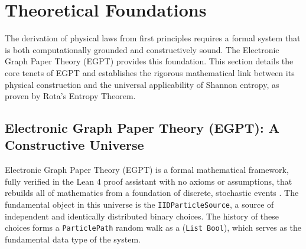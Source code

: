\documentclass[11pt, letterpaper]{article}
\begin{document}
\section{Theoretical Foundations}

The derivation of physical laws from first principles requires a formal system that is both computationally grounded and constructively sound. The Electronic Graph Paper Theory (EGPT) provides this foundation. This section details the core tenets of EGPT and establishes the rigorous mathematical link between its physical construction and the universal applicability of Shannon entropy, as proven by Rota's Entropy Theorem.

\subsection{Electronic Graph Paper Theory (EGPT): A Constructive Universe}

Electronic Graph Paper Theory (EGPT) is a formal mathematical framework, fully verified in the Lean 4 proof assistant with no axioms or assumptions, that rebuilds all of mathematics from a foundation of discrete, stochastic events \cite{EGPTRepo}. The fundamental object in this universe is the \texttt{IIDParticleSource}, a source of independent and identically distributed binary choices. The history of these choices forms a \texttt{ParticlePath} random walk as a (\texttt{List Bool}), which serves as the fundamental data type of the system.
\end{document}
